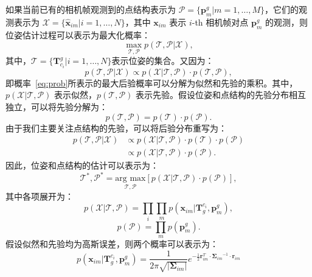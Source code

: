 如果当前已有的相机帧观测到的点结构表示为 $\mathcal{P} = \{\symbf{p}^g_m | m = 1, \dots, M\}$，它们的观测表示为 $\mathcal{X} = \{\hat{\symbf{x}}_{im}|i=1,\dots, N\}$，其中 $\symbf{x}_{im}$ 表示 $i$-th 相机帧对点 $\symbf{p}^g_m$ 的观测，则位姿估计过程可以表示为最大化概率：
\begin{equation}
\label{eq:prob}
  \max_{\mathcal{T}, \mathcal{P}} p(\mathcal{T}, \mathcal{P} | \mathcal{X}),
\end{equation}
其中，$\mathcal{T} = \{ \symbf{T}_{c_i}^g | i=1,\dots, N\}$表示位姿的集合。又因为：
\begin{equation}
p(\mathcal{T}, \mathcal{P} | \mathcal{X}) \propto p(\mathcal{X} | \mathcal{T}, \mathcal{P}) \cdot p(\mathcal{T}, \mathcal{P}),
\end{equation}
即概率~\eqref{eq:prob}所表示的最大后验概率可以分解为似然和先验的乘积。其中，$p(\mathcal{X} | \mathcal{T}, \mathcal{P})$ 表示似然，$p(\mathcal{T}, \mathcal{P})$ 表示先验。假设位姿和点结构的先验分布相互独立，可以将先验分解为：
\begin{equation}
  p(\mathcal{T}, \mathcal{P}) = p(\mathcal{T}) \cdot p(\mathcal{P}).
\end{equation}
由于我们主要关注点结构的先验，可以将后验分布重写为：
\begin{equation}
\begin{aligned}
  p(\mathcal{T}, \mathcal{P} | \mathcal{X}) &\propto p(\mathcal{X} | \mathcal{T}, \mathcal{P}) \cdot p(\mathcal{T}) \cdot p(\mathcal{P}) \\
  &\propto p(\mathcal{X} | \mathcal{T}, \mathcal{P}) \cdot p(\mathcal{P}).
\end{aligned}
\end{equation}
因此，位姿和点结构的估计可以表示为：
\begin{equation}
  \label{eq:max_post}
  \mathcal{T}^*, \mathcal{P}^* = \underset{\mathcal{T}, \mathcal{P}}{\text{arg max}} \left[ p(\mathcal{X} | \mathcal{T}, \mathcal{P}) \cdot p(\mathcal{P}) \right],
\end{equation}
其中各项展开为：
\begin{equation}
p(\mathcal{X} | \mathcal{T}, \mathcal{P}) = \prod_i \prod_m p(\symbf{x}_{im} | \symbf{T}_g^{c_i}, \symbf{p}_m^g),
\end{equation}
\begin{equation}
p(\mathcal{P}) = \prod_m p(\symbf{p}_m^g).
\end{equation}
假设似然和先验均为高斯误差，则两个概率可以表示为：
\begin{equation}
  p(\symbf{x}_{im} | \symbf{T}_g^{c_i}, \symbf{p}_m^g) = \frac{1}{2\pi\sqrt{|\symbf{\Sigma}_{im}|}}e^{-\frac{1}{2}\symbf{r}_{im}^T \cdot {\symbf{\Sigma}_{im}}^{-1}\cdot \symbf{r}_{im}}
\end{equation}
